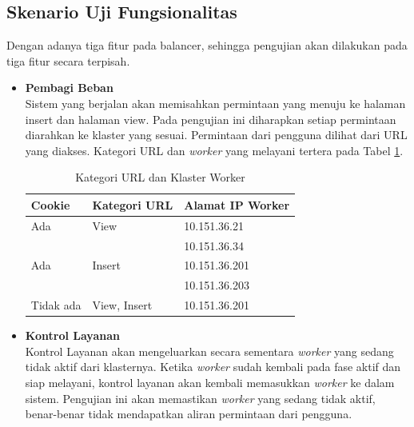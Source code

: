 \documentclass{ta-its}
\begin{document}
			\subsection{Skenario Uji Fungsionalitas}
				Dengan adanya tiga fitur pada balancer, sehingga pengujian akan dilakukan pada tiga fitur secara terpisah.
				\begin{itemize}
					\item \textbf{Pembagi Beban} \\
					Sistem yang berjalan akan memisahkan permintaan yang menuju	ke halaman insert dan halaman view. Pada pengujian ini diharapkan setiap permintaan diarahkan ke klaster yang sesuai. Permintaan dari pengguna dilihat dari URL yang diakses. Kategori URL dan \textit{worker} yang melayani tertera pada Tabel \ref{tabelKategoriURL}.
					
					\begin{longtable}{|p{}|p{0.3\textwidth}|p{}|} %
						
						\caption{Kategori URL dan Klaster Worker} \label{tabelKategoriURL} \\
						\hline
						\textbf{Cookie} & \textbf{Kategori URL} & \textbf{Alamat IP Worker} \\ \hline
						
						\endhead
						\endfoot
						\endlastfoot
						
						Ada & View & 10.151.36.21 \\ \cline{3-3}
						&& 10.151.36.34 \\ \hline
						Ada & Insert & 10.151.36.201 \\ \cline{3-3}
						&& 10.151.36.203 \\ \hline
						Tidak ada & View, Insert & 10.151.36.201 \\ \hline
						
						
					\end{longtable}
					
					\item \textbf{Kontrol Layanan} \\
					Kontrol Layanan akan mengeluarkan secara sementara \textit{worker} yang sedang tidak aktif dari klasternya. Ketika \textit{worker} sudah kembali pada fase aktif dan siap melayani, kontrol layanan akan kembali memasukkan \textit{worker} ke dalam sistem. Pengujian ini akan memastikan \textit{worker} yang sedang tidak aktif, benar-benar tidak mendapatkan aliran permintaan dari pengguna.
					

\end{itemize}
\end{document}
